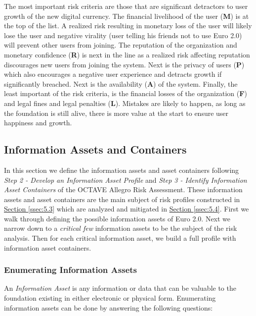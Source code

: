 \documentclass[12pt]{article} %
\newcommand{\hypersectionref}[1]{\hyperref[#1]{Section \ref{#1}}}
\begin{document}
{The most important risk criteria are those that are significant detractors to user growth of the new digital currency. The financial livelihood of the user (\textbf{M}) is at the top of the list. A realized risk resulting in monetary loss of the user will likely lose the user and negative virality (user telling his friends not to use Euro 2.0) will prevent other users from joining.  The reputation of the organization and monetary confidence (\textbf{R}) is next in the line as a realized risk affecting reputation discourages new users from joining the system. Next is the privacy of users (\textbf{P}) which also encourages a negative user experience and detracts growth if significantly breached. Next is the availability (\textbf{A}) of the system. Finally, the least important of the risk criteria, is the financial losses of the organization (\textbf{F}) and legal fines and legal penalties (\textbf{L}). Mistakes are likely to happen, as long as the foundation is still alive, there is more value at the start to ensure user happiness and growth.

\subsection{Information Assets and Containers} \label{ssec:5.2}

In this section we define the information assets and asset containers following \textit{Step 2 - Develop an Information Asset Profile} and \textit{Step 3 - Identify Information Asset Containers} of the OCTAVE Allegro Risk Assessment. These information assets and asset containers are the main subject of risk profiles constructed in \hypersectionref{ssec:5.3} which are analyzed and mitigated in \hypersectionref{ssec:5.4}. First we walk through defining the possible information assets of Euro 2.0. Next we narrow down to a \textit{critical few} information assets to be the subject of the risk analysis. Then for each critical information asset, we build a full profile with information asset containers.

\subsubsection{Enumerating Information Assets} \label{sssec:5.2:enumeratingAssets}

An \textit{Information Asset} is any information or data that can be valuable to the foundation existing in either electronic or physical form. Enumerating information assets can be done by answering the following questions\cite{CaralliIntroducingOCTAVE2007}:

}
\end{document}
